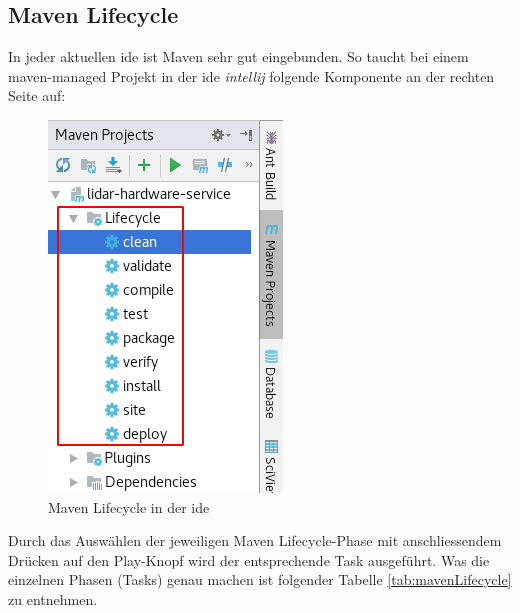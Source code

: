 \subsection{Maven Lifecycle}
In jeder aktuellen \acrshort{ide} ist Maven sehr gut eingebunden. So taucht bei einem maven-managed Projekt in der \acrshort{ide} \textit{\Gls{intellij}} folgende Komponente an der rechten Seite auf:
\begin{figure}[H]
	\centering
	\includegraphics[scale=0.5]{img/maven-lifecycle-ide.png}
	\caption{Maven Lifecycle in der \acrshort{ide}}
	\label{fig:maven-ide}
\end{figure}
Durch das Auswählen der jeweiligen Maven Lifecycle-Phase mit anschliessendem Drücken auf den Play-Knopf wird der entsprechende Task ausgeführt. Was die einzelnen Phasen (Tasks) genau machen ist folgender Tabelle \ref{tab:mavenLifecycle} zu entnehmen.

